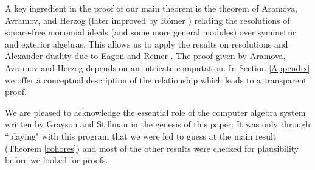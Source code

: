 \documentclass{tran-l}
\theoremstyle{definition}
\theoremstyle{remark}
\begin{document}
A key ingredient in the proof of our main theorem is the theorem of
Aramova, Avramov, and Herzog \cite{AAH} (later improved by R\"omer \cite{Ro})
relating the resolutions of square-free monomial ideals (and some more
general modules) over symmetric and exterior algebras. This allows us to
apply the results on resolutions and Alexander duality due to Eagon and
Reiner \cite{ER}.   The proof given by Aramova, Avramov and Herzog depends
on an intricate computation. In Section \ref{Appendix} we offer a conceptual
description of the relationship which leads to a transparent proof.

We are pleased to acknowledge the essential role of the computer
algebra system written by Grayson and Stillman \cite{GS} in the
genesis of this paper: It was only through ``playing" with this
program that we were led to guess at the main result (Theorem \ref{cohores})
and most of the other results were checked for plausibility
before we looked for proofs.
\end{document}
